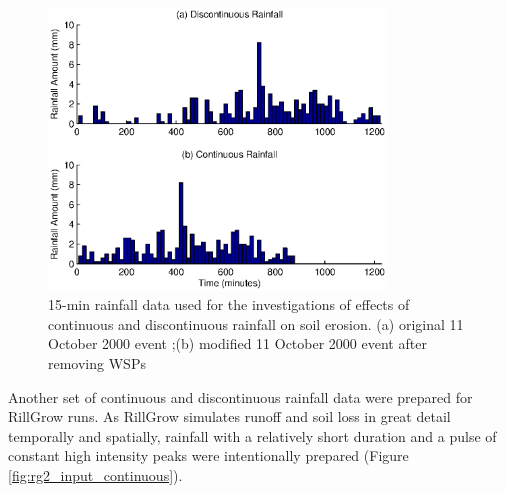 \begin{figure}[htpb]
  \centering
    \includegraphics[width=0.8\textwidth]
{./img/rainfall_discont_cont_input}
  \caption[15-min rainfall data used for the investigations of effects of
continuous and discontinuous rainfall on soil erosion.]{15-min rainfall data
used for the investigations of effects of continuous and discontinuous rainfall
on soil erosion. (a) original 11 October 2000 event ;(b) modified 11 October
2000 event after removing WSPs}
  \label{fig:rainfall_discont_cont}
\end{figure}

Another set of continuous and discontinuous rainfall data were prepared for
RillGrow runs. As RillGrow simulates runoff and soil loss in great detail
temporally and spatially, rainfall with a relatively short duration and a pulse
of constant high intensity peaks were intentionally prepared (Figure
\ref{fig:rg2_input_continuous}).

